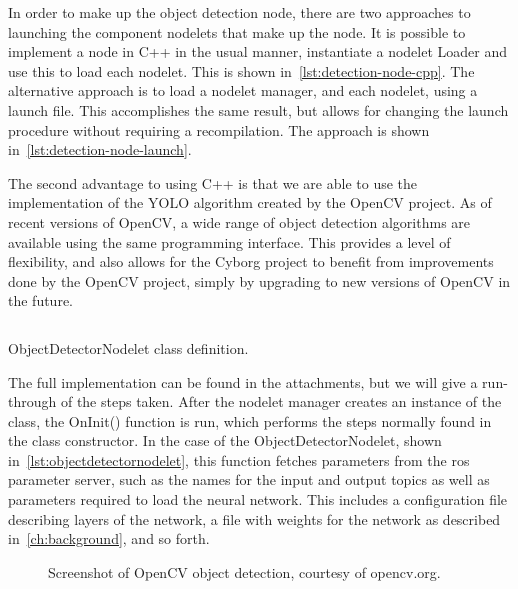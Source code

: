 \documentclass[\rootfolder/main.tex]{subfiles}
\begin{document}
In order to make up the object detection node, there are two approaches to launching the component nodelets that make up the node.
It is possible to implement a node in C++ in the usual manner, instantiate a nodelet Loader and use this to load each nodelet.
This is shown in~\cref{lst:detection-node-cpp}.
The alternative approach is to load a nodelet manager, and each nodelet, using a launch file.
This accomplishes the same result, but allows for changing the launch procedure without requiring a recompilation.
The approach is shown in~\cref{lst:detection-node-launch}.

The second advantage to using C++ is that we are able to use the implementation of the YOLO algorithm created by the OpenCV project.
As of recent versions of OpenCV, a wide range of object detection algorithms are available using the same programming interface.
This provides a level of flexibility, and also allows for the Cyborg project to benefit from improvements done by the OpenCV project, simply by upgrading to new versions of OpenCV in the future.

\begin{listing}
    \inputminted{cpp}{\rootfolder/Chapters/Chapter5/Listings/ObjectDetectorNodelet}
    \caption{ObjectDetectorNodelet class definition.}
    \label{lst:objectdetectornodelet}
\end{listing}

The full implementation can be found in the attachments, but we will give a run-through of the steps taken.
After the nodelet manager creates an instance of the class, the OnInit() function is run, which performs the steps normally found in the class constructor.
In the case of the ObjectDetectorNodelet, shown in~\cref{lst:objectdetectornodelet}, this function fetches parameters from the \acrshort{ros} parameter server, such as the names for the input and output topics as well as parameters required to load the neural network.
This includes a configuration file describing layers of the network, a file with weights for the network as described in~\cref{ch:background}, and so forth.

\begin{figure}[ht]
    \caption[Screenshot of OpenCV object detection.]%
            {Screenshot of OpenCV object detection, courtesy of opencv.org.}
    \label{fig:opencv}
\end{figure}
\end{document}
